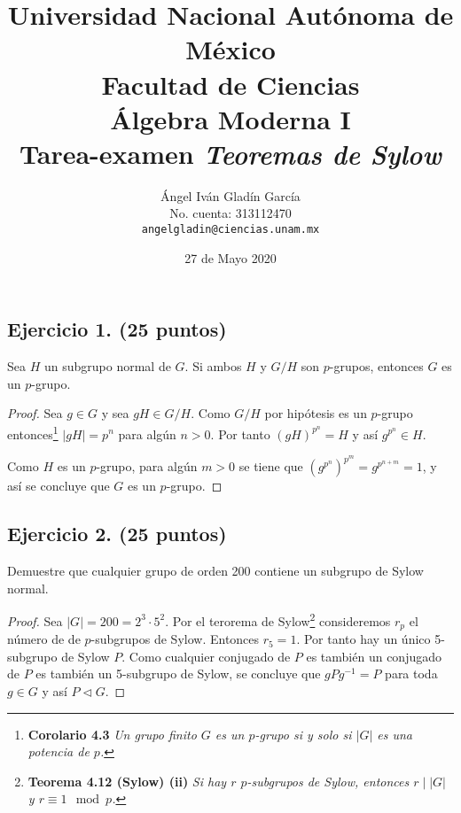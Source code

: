 \documentclass[letterpaper]{article}
\begin{document}
\title{
    \vspace{-2.2em}
        Universidad Nacional Autónoma de México\\
        Facultad de Ciencias\\
        Álgebra Moderna I\\
    \vspace{.5cm}
    \large
        \textbf{Tarea-examen \emph{Teoremas de Sylow}}
}
\author{
    Ángel Iván Gladín García\\
    No. cuenta: 313112470\\
    \texttt{angelgladin@ciencias.unam.mx}
}
\date{27 de Mayo 2020}
\maketitle

\newtheorem{theorem}{Teorema}
\newtheorem{example}{Ejemplo}
\newtheorem{corollary}{Corolario}
\newtheorem{lemma}{Lemma}
\newtheorem{definition}{Definicion}
\newtheorem{prop}{Proposicion}

\subsection*{Ejercicio 1. (25 puntos)}
Sea $H$ un subgrupo normal de $G$. Si ambos $H$ y $G/H$ son $p$-grupos, entonces $G$ es un $p$-grupo.
\begin{proof}
Sea $g \in G$ y sea $gH \in G/H$. Como $G/H$ por hipótesis es un $p$-grupo entonces\footnote{
    \textbf{Corolario 4.3} \emph{Un grupo finito $G$ es un $p$-grupo si y solo si $|G|$ es una potencia de $p$.}
} $|gH| = p^n$ para algún $n > 0$. Por tanto $(gH)^{p^n} = H$ y así $g^{p^n} \in H$.

Como $H$ es un $p$-grupo, para algún $m > 0$ se tiene que $\left(g^{p^n}\right)^{p^m} = g^{p^{n+m}}=1$, y así se
concluye que $G$ es un $p$-grupo.
\end{proof}

\subsection*{Ejercicio 2. (25 puntos)}
Demuestre que cualquier grupo de orden 200 contiene un subgrupo de Sylow normal.
\begin{proof}
Sea $|G| = 200 = 2^3 \cdot 5^2$. Por el terorema de Sylow\footnote{
    \textbf{Teorema 4.12 (Sylow) (ii)} \emph{Si hay $r$ $p$-subgrupos de Sylow, entonces $r \mid |G|$ y
    $r \equiv 1 \mod p$.}
} consideremos $r_p$ el número de de $p$-subgrupos de Sylow. Entonces $r_5 = 1$. Por tanto hay un único
5-subgrupo de Sylow $P$. Como cualquier conjugado de $P$ es también un conjugado de $P$ es también un
5-subgrupo de Sylow, se concluye que $gPg^{-1} = P$ para toda $g \in G$ y así $P \lhd G$.
\end{proof}
\end{document}
